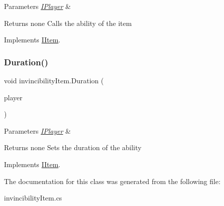 \begin{DoxyParams}{Parameters}
{\em \mbox{\hyperlink{class_i_player}{I\+Player}}} & \\
\hline
\end{DoxyParams}
\begin{DoxyReturn}{Returns}
none Calls the ability of the item 
\end{DoxyReturn}


Implements \mbox{\hyperlink{interface_i_item_afe73efbf8316273df20162d6f4b20648}{I\+Item}}.

\mbox{\label{classinvincibility_item_abe2368f3358065d15547f24e8cee2de5}} 
\subsubsection{\texorpdfstring{Duration()}{Duration()}}
{\footnotesize\ttfamily void invincibility\+Item.\+Duration (\begin{DoxyParamCaption}\item[{\mbox{\hyperlink{class_i_player}{I\+Player}}}]{player }\end{DoxyParamCaption})\hspace{0.3cm}{\ttfamily [inline]}}


\begin{DoxyParams}{Parameters}
{\em \mbox{\hyperlink{class_i_player}{I\+Player}}} & \\
\hline
\end{DoxyParams}
\begin{DoxyReturn}{Returns}
none Sets the duration of the ability 
\end{DoxyReturn}


Implements \mbox{\hyperlink{interface_i_item_a797c1d62a7828bf428cc486ceaf18e9c}{I\+Item}}.



The documentation for this class was generated from the following file\+:\begin{DoxyCompactItemize}
\item 
invincibility\+Item.\+cs\end{DoxyCompactItemize}
